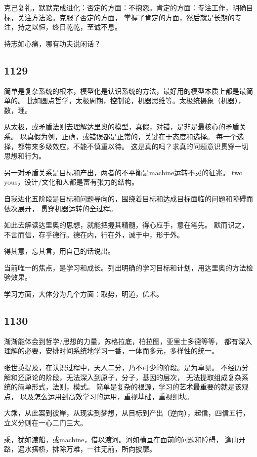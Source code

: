 克己复礼，默默完成进化：否定的方面：不抱怨。肯定的方面：专注工作，明确目标，关注方法论。克服了否定的方面，
掌握了肯定的方面，然后就是长期的专注，持之以恒，终日乾乾，至诚不息。

持志如心痛，哪有功夫说闲话？

\subsection{1129}

简单是复杂系统的根本，模型化是认识系统的方法，最好用的模型本质上都是最简单的。
比如圆点哲学，太极周期，控制论，机器思维等。太极统摄象（机器），数，理。

从太极，或矛盾法则去理解达里奥的模型，真假，对错，是非是最核心的矛盾关系。
以真假为例，正确，或错误都是正常的，关键在于态度和选择。
每一个选择，都带来多级效应，不能不慎重以待。
这是真的吗？求真的问题意识贯穿一切思想和行为。

另一对矛盾关系是目标和产出，两者的不平衡是machine运转不灵的征兆。
two yous，设计/文化和人都是富有张力的结构。

自我进化五阶段是目标和问题导向的，围绕着目标和达成目标面临的问题和障碍而依次展开，
贯穿机器运转的全过程。

如此去解读达里奥的思想，就能把握其精髓，得心应手，意在笔先。
默而识之，不言而信，存乎德行。德在内，行在外，诚于中，形于外。

得其意，忘其言，用自己的话说出。

当前唯一的焦点，是学习和成长。列出明确的学习目标和计划，用达里奥的方法检验效果。

学习方面，大体分为几个方面：取势，明道，优术。

\subsection{1130}

渐渐能体会到哲学/思想的力量，苏格拉底，柏拉图，亚里士多德等等，
都有深入理解的必要，安排时间系统地学习一番，一体而多元，多样性的统一。

张世英提及，在认识过程中，天人二分，乃不可少的阶段。是为卓见。
不经历分解和还原论的阶段，无法深入到原子，分子，基因的层次，
无法提取组成复杂系统的简单形式，法则，模式。
简单是复杂的根源，学习的艺术最重要的就是该观点，
以及怎么运用到高效学习的运用，重视基础，重视组块。

大乘，从此案到彼岸，从现实到梦想，从目标到产出（逆向），起信，四信五行，
立义分则在一心二门三大。

乘，犹如渡船，或machine，借以渡河。河如横亘在面前的问题和障碍，
逢山开路，遇水搭桥，排除万难，一往无前，所向披靡。

